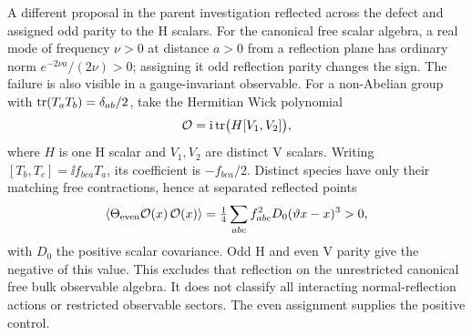 A different proposal in the parent investigation reflected across
the defect and assigned odd parity to the H scalars. For the canonical
free scalar algebra, a real mode of frequency $\nu>0$ at distance
$a>0$ from a reflection plane has ordinary norm
$e^{-2\nu a}/(2\nu)>0$; assigning it odd reflection parity changes
the sign. The failure is also visible in a gauge-invariant observable.
For a non-Abelian group with $\operatorname{tr}(T_aT_b)=\delta_{ab}/2$, take the
Hermitian Wick polynomial
\begin{equation}
 \mathcal O=\mathrm i\operatorname{tr}\bigl(H[V_1,V_2]\bigr),
\end{equation}
where $H$ is one H scalar and $V_1,V_2$ are distinct V scalars.
Writing $[T_b,T_c]=\ii f_{bca}T_a$, its coefficient is
$-f_{bca}/2$. Distinct species have only their matching free
contractions, hence at separated reflected points
\begin{equation}
 \left\langle\Theta_{\rm even}\mathcal O(x)\,\mathcal O(x)\right\rangle
 =\tfrac14\sum_{abc}f_{abc}^2D_0(\vartheta x-x)^3>0,
\end{equation}
with $D_0$ the positive scalar covariance. Odd H and even V parity
give the negative of this value. This excludes that reflection on
the unrestricted canonical free bulk observable algebra. It does
not classify all interacting normal-reflection actions or restricted
observable sectors. The even assignment supplies the positive control.
